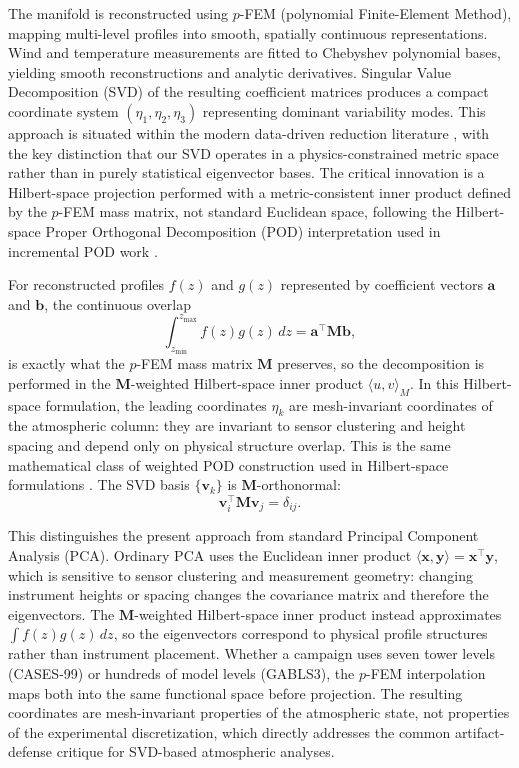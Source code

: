 \documentclass[12pt,a4paper]{article}
\newcommand{\vect}[1]{\mathbf{#1}}
\newcommand{\mat}[1]{\mathbf{#1}}
\begin{document}
The manifold is reconstructed using $p$-FEM (polynomial Finite-Element Method), mapping multi-level profiles into smooth, spatially continuous representations. Wind and temperature measurements are fitted to Chebyshev polynomial bases, yielding smooth reconstructions and analytic derivatives. Singular Value Decomposition (SVD) of the resulting coefficient matrices produces a compact coordinate system $(\eta_1, \eta_2, \eta_3)$ representing dominant variability modes. This approach is situated within the modern data-driven reduction literature \citep{brunton2016, peherstorfer2016, shimizu2017}, with the key distinction that our SVD operates in a physics-constrained metric space rather than in purely statistical eigenvector bases. The critical innovation is a Hilbert-space projection performed with a metric-consistent inner product defined by the $p$-FEM mass matrix, not standard Euclidean space, following the Hilbert-space Proper Orthogonal Decomposition (POD) interpretation used in incremental POD work \citep{FareedPOD2018}.

For reconstructed profiles $f(z)$ and $g(z)$ represented by coefficient vectors $\vect{a}$ and $\vect{b}$, the continuous overlap
\begin{equation}
\int_{z_{\text{min}}}^{z_{\text{max}}} f(z)g(z)\,dz = \vect{a}^\top \mat{M} \vect{b},
\end{equation}
is exactly what the $p$-FEM mass matrix $\mat{M}$ preserves, so the decomposition is performed in the $\mat{M}$-weighted Hilbert-space inner product $\langle u,v\rangle_M$. In this Hilbert-space formulation, the leading coordinates $\eta_k$ are mesh-invariant coordinates of the atmospheric column: they are invariant to sensor clustering and height spacing and depend only on physical structure overlap. This is the same mathematical class of weighted POD construction used in Hilbert-space formulations \citep{FareedPOD2018}. The SVD basis $\{\vect{v}_k\}$ is $\mat{M}$-orthonormal:
\begin{equation}
\vect{v}_i^\top \mat{M} \vect{v}_j = \delta_{ij}.
\end{equation}

This distinguishes the present approach from standard Principal Component Analysis (PCA). Ordinary PCA uses the Euclidean inner product $\langle \vect{x}, \vect{y}\rangle = \vect{x}^\top \vect{y}$, which is sensitive to sensor clustering and measurement geometry: changing instrument heights or spacing changes the covariance matrix and therefore the eigenvectors. The $\mat{M}$-weighted Hilbert-space inner product instead approximates $\int f(z)g(z)\,dz$, so the eigenvectors correspond to physical profile structures rather than instrument placement. Whether a campaign uses seven tower levels (CASES-99) or hundreds of model levels (GABLS3), the $p$-FEM interpolation maps both into the same functional space before projection. The resulting coordinates are mesh-invariant properties of the atmospheric state, not properties of the experimental discretization, which directly addresses the common artifact-defense critique for SVD-based atmospheric analyses.
\end{document}
